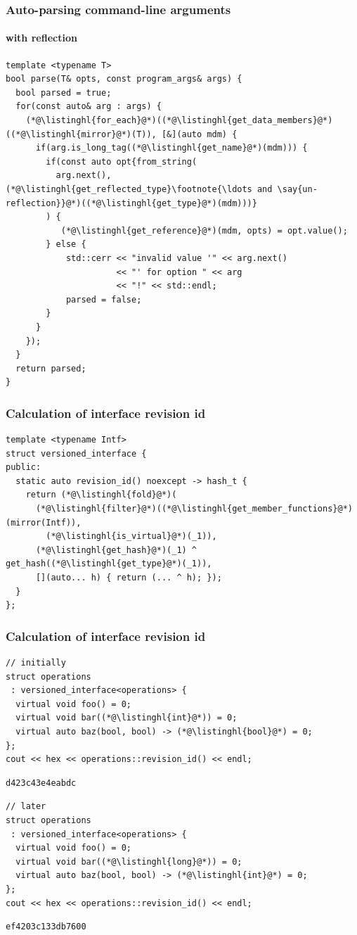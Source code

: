 \documentclass[compress,table,xcolor=table]{beamer}
\begin{document}
\begin{frame}[fragile]
  \frametitle{Auto-parsing command-line arguments}
  \framesubtitle{with reflection}
  \begin{lstlisting}[language=c++2x,basicstyle=\scriptsize\ttfamily]
template <typename T>
bool parse(T& opts, const program_args& args) {
  bool parsed = true;
  for(const auto& arg : args) {
    (*@\listinghl{for_each}@*)((*@\listinghl{get_data_members}@*)((*@\listinghl{mirror}@*)(T)), [&](auto mdm) {
      if(arg.is_long_tag((*@\listinghl{get_name}@*)(mdm))) {
        if(const auto opt{from_string(
          arg.next(), (*@\listinghl{get_reflected_type}\footnote{\ldots and \say{un-reflection}}@*)((*@\listinghl{get_type}@*)(mdm)))}
        ) {
           (*@\listinghl{get_reference}@*)(mdm, opts) = opt.value();
        } else {
            std::cerr << "invalid value '" << arg.next()
                      << "' for option " << arg
                      << "!" << std::endl;
            parsed = false;
        }
      }
    });
  }
  return parsed;
}
  \end{lstlisting}
\end{frame}
\begin{frame}[fragile]
  \frametitle{Calculation of interface revision id}
  \begin{lstlisting}[language=c++2x,basicstyle=\small\ttfamily]
template <typename Intf>
struct versioned_interface {
public:
  static auto revision_id() noexcept -> hash_t {
    return (*@\listinghl{fold}@*)(
      (*@\listinghl{filter}@*)((*@\listinghl{get_member_functions}@*)(mirror(Intf)),
        (*@\listinghl{is_virtual}@*)(_1)),
      (*@\listinghl{get_hash}@*)(_1) ^ get_hash((*@\listinghl{get_type}@*)(_1)),
      [](auto... h) { return (... ^ h); });
  }
};
  \end{lstlisting}
\end{frame}
\begin{frame}[fragile]
  \frametitle{Calculation of interface revision id}
    \smaller
    \begin{lstlisting}[language=c++2x,basicstyle=\scriptsize\ttfamily]
// initially
struct operations
 : versioned_interface<operations> {
  virtual void foo() = 0;
  virtual void bar((*@\listinghl{int}@*)) = 0;
  virtual auto baz(bool, bool) -> (*@\listinghl{bool}@*) = 0;
};
cout << hex << operations::revision_id() << endl;
    \end{lstlisting}
    \begin{verbatim}
d423c43e4eabdc
    \end{verbatim}
    \vfill
    \begin{lstlisting}[language=c++2x,basicstyle=\scriptsize\ttfamily]
// later
struct operations
 : versioned_interface<operations> {
  virtual void foo() = 0;
  virtual void bar((*@\listinghl{long}@*)) = 0;
  virtual auto baz(bool, bool) -> (*@\listinghl{int}@*) = 0;
};
cout << hex << operations::revision_id() << endl;
    \end{lstlisting}
    \begin{verbatim}
ef4203c133db7600
    \end{verbatim}
\end{frame}
\end{document}
